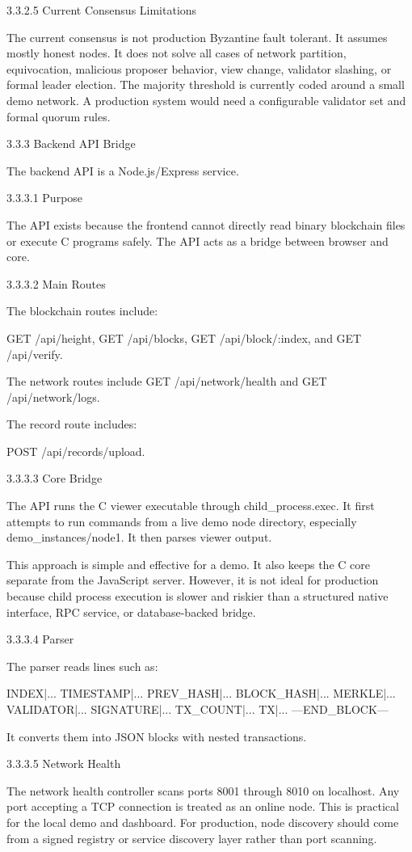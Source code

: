 \documentclass[12pt]{article}
\begin{document}
3.3.2.5 Current Consensus Limitations

The current consensus is not production Byzantine fault tolerant. It assumes mostly honest nodes. It does not solve all cases of network partition, equivocation, malicious proposer behavior, view change, validator slashing, or formal leader election. The majority threshold is currently coded around a small demo network. A production system would need a configurable validator set and formal quorum rules.

3.3.3 Backend API Bridge

The backend API is a Node.js/Express service.

3.3.3.1 Purpose

The API exists because the frontend cannot directly read binary blockchain files or execute C programs safely. The API acts as a bridge between browser and core.

3.3.3.2 Main Routes

The blockchain routes include:

 GET /api/height, GET /api/blocks, GET /api/block/:index, and GET /api/verify.

The network routes include GET /api/network/health and GET /api/network/logs.

The record route includes:

 POST /api/records/upload.

3.3.3.3 Core Bridge

The API runs the C viewer executable through child\_process.exec. It first attempts to run commands from a live demo node directory, especially demo\_instances/node1. It then parses viewer output.

This approach is simple and effective for a demo. It also keeps the C core separate from the JavaScript server. However, it is not ideal for production because child process execution is slower and riskier than a structured native interface, RPC service, or database-backed bridge.

3.3.3.4 Parser

The parser reads lines such as:

INDEX|...
TIMESTAMP|...
PREV\_HASH|...
BLOCK\_HASH|...
MERKLE|...
VALIDATOR|...
SIGNATURE|...
TX\_COUNT|...
TX|...
---END\_BLOCK---

It converts them into JSON blocks with nested transactions.

3.3.3.5 Network Health

The network health controller scans ports 8001 through 8010 on localhost. Any port accepting a TCP connection is treated as an online node. This is practical for the local demo and dashboard. For production, node discovery should come from a signed registry or service discovery layer rather than port scanning.
\end{document}
